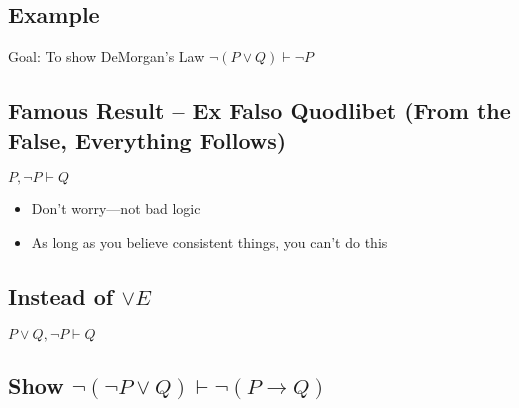 \documentclass[12pt,letterpaper]{phi201}
\begin{document}
\pagebreak

\subsection{Example}

Goal: To show DeMorgan's Law $\neg(P \lor Q) \vdash \neg P$ \\

\begin{logicproof}
\end{logicproof}

\subsection{Famous Result -- Ex Falso Quodlibet (From the False, Everything Follows)}

$P, \neg P \vdash Q$ \\

\begin{logicproof}
\end{logicproof}
\begin{itemize}
    \item Don't worry---not bad logic
    \item As long as you believe consistent things, you can't do this
\end{itemize}

\subsection{Instead of $\lor E$}

$P \lor Q, \neg P \vdash Q$ \\

\begin{logicproof}
\end{logicproof}

\subsection{Show $\neg(\neg P \lor Q) \vdash \neg(P \to Q)$}
\end{document}
